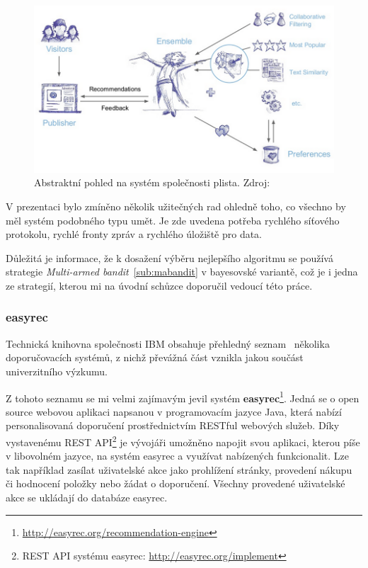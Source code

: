 \documentclass[thesis=M,czech]{FITthesis}[2014/05/07]
\begin{document}
\begin{figure}\centering
	\includegraphics[width=1.0\textwidth]{obr/plistaEnsemble.png}
 	\caption[Abstraktní pohled na systém společnosti plista]{Abstraktní pohled na systém společnosti plista. Zdroj: \cite{slideshare:plista}}\label{fig:plista}
\end{figure}	

V prezentaci bylo zmíněno několik užitečných rad ohledně toho, co všechno by měl systém podobného typu umět. Je zde uvedena potřeba rychlého síťového protokolu, rychlé fronty zpráv a rychlého úložiště pro data.

Důležitá je informace, že k dosažení výběru nejlepšího algoritmu se používá strategie \emph{Multi-armed bandit}~\ref{sub:mabandit} v bayesovské variantě, což je i jedna ze strategií, kterou mi na úvodní schůzce doporučil vedoucí této práce.

\subsubsection{easyrec}
Technická knihovna společnosti IBM obsahuje přehledný seznam~\cite{ibm} několika doporučovacích systémů, z nichž převážná část vznikla jakou součást univerzitního výzkumu.

Z tohoto seznamu se mi velmi zajímavým jevil systém \textbf{easyrec}\footnote{\url{http://easyrec.org/recommendation-engine}}. Jedná se o open source webovou aplikaci napsanou v programovacím jazyce Java, která nabízí personalisovaná doporučení prostřednictvím RESTful webových služeb. Díky vystavenému REST API\footnote{REST API systému easyrec: \url{http://easyrec.org/implement}} je vývojáři umožněno napojit svou aplikaci, kterou píše v libovolném jazyce, na systém easyrec a využívat nabízených funkcionalit. Lze tak například zasílat uživatelské akce jako prohlížení stránky, provedení nákupu či hodnocení položky nebo žádat o doporučení. Všechny provedené uživatelské akce se ukládají do databáze easyrec.
\end{document}
